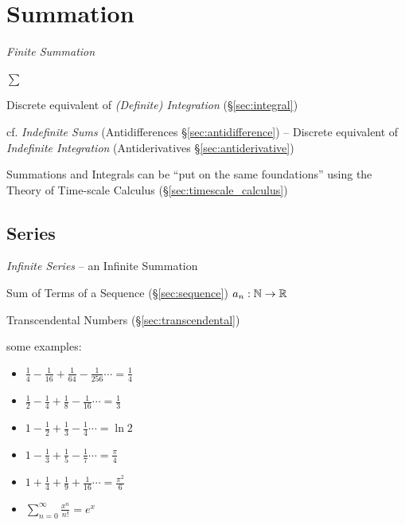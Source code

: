 \section{Summation}\label{sec:summation}

\emph{Finite Summation}

$\sum$

Discrete equivalent of \emph{(Definite) Integration} (\S\ref{sec:integral})

\fist cf. \emph{Indefinite Sums} (Antidifferences \S\ref{sec:antidifference}) --
Discrete equivalent of \emph{Indefinite Integration} (Antiderivatives
\S\ref{sec:antiderivative})

Summations and Integrals can be ``put on the same foundations'' using the Theory
of Time-scale Calculus (\S\ref{sec:timescale_calculus})



\subsection{Series}\label{sec:series}

\emph{Infinite Series} -- an Infinite Summation

Sum of Terms of a Sequence (\S\ref{sec:sequence}) $a_n : \mathbb{N}
\rightarrow \mathbb{R}$

Transcendental Numbers (\S\ref{sec:transcendental})

some examples:
\begin{itemize}
  \item $\frac{1}{4} - \frac{1}{16} + \frac{1}{64} - \frac{1}{256} \cdots
    = \frac{1}{4}$
  \item $\frac{1}{2} - \frac{1}{4} + \frac{1}{8} - \frac{1}{16} \cdots
    = \frac{1}{3}$
  \item $1 - \frac{1}{2} + \frac{1}{3} - \frac{1}{4} \cdots  = \ln{2}$
  \item $1 - \frac{1}{3} + \frac{1}{5} - \frac{1}{7} \cdots  = \frac{\pi}{4}$
  \item $1 + \frac{1}{4} + \frac{1}{9} + \frac{1}{16} \cdots = \frac{\pi^2}{6}$
  \item $\sum_{n=0}^\infty \frac{x^n}{n!} = e^x$
\end{itemize}

